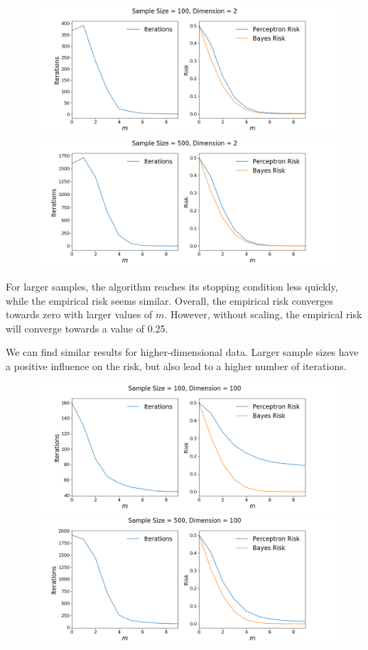 \documentclass[a4paper, 11pt]{article} %
\begin{document}
\begin{figure}[H]
\centering
\includegraphics[scale= 0.4]{Perceptron_Non_Seperable100_d2}
\includegraphics[scale= 0.4]{Perceptron_Non_Seperable500_d2}
\end{figure}

For larger samples, the algorithm reaches its stopping condition less quickly, while the empirical risk seems similar. Overall, the empirical risk converges towards zero with larger values of $m$. However, without scaling, the empirical risk will converge towards a value of 0.25. 
\newpage

We can find similar results for higher-dimensional data. Larger sample sizes have a positive influence on the risk, but also lead to a higher number of iterations. 

\begin{figure}[H]
\centering
\includegraphics[scale= 0.4]{Perceptron_Non_Seperable100_d100}
\includegraphics[scale= 0.4]{Perceptron_Non_Seperable500_d100}
\end{figure}
\end{document}
